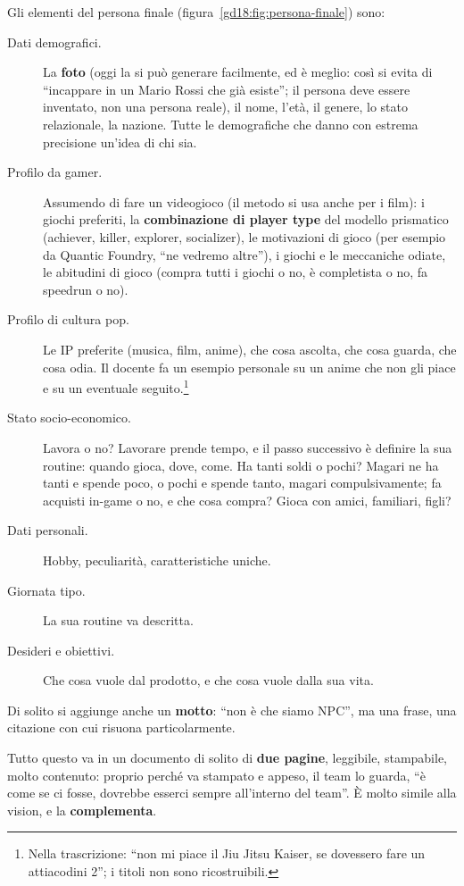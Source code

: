 Gli elementi del persona finale (figura~\ref{gd18:fig:persona-finale}) sono:
\begin{description}
  \item[Dati demografici.] La \textbf{foto} (oggi la si può generare facilmente, ed è
        meglio: così si evita di ``incappare in un Mario Rossi che già esiste''; il
        persona deve essere inventato, non una persona reale), il nome, l'età, il
        genere, lo stato relazionale, la nazione. Tutte le demografiche che danno con
        estrema precisione un'idea di chi sia.
  \item[Profilo da gamer.] Assumendo di fare un videogioco (il metodo si usa anche per
        i film): i giochi preferiti, la \textbf{combinazione di player type} del
        modello prismatico (achiever, killer, explorer, socializer), le motivazioni di
        gioco (per esempio da Quantic Foundry, ``ne vedremo altre''), i giochi e le
        meccaniche odiate, le abitudini di gioco (compra tutti i giochi o no, è
        completista o no, fa speedrun o no).
  \item[Profilo di cultura pop.] Le IP preferite (musica, film, anime), che cosa
        ascolta, che cosa guarda, che cosa odia. Il docente fa un esempio personale
        su un anime che non gli piace e su un eventuale seguito.\footnote{Nella
        trascrizione: ``non mi piace il Jiu Jitsu Kaiser, se dovessero fare un
        attiacodini 2''; i titoli non sono ricostruibili.}
  \item[Stato socio-economico.] Lavora o no? Lavorare prende tempo, e il passo
        successivo è definire la sua routine: quando gioca, dove, come. Ha tanti soldi
        o pochi? Magari ne ha tanti e spende poco, o pochi e spende tanto, magari
        compulsivamente; fa acquisti in-game o no, e che cosa compra? Gioca con amici,
        familiari, figli?
  \item[Dati personali.] Hobby, peculiarità, caratteristiche uniche.
  \item[Giornata tipo.] La sua routine va descritta.
  \item[Desideri e obiettivi.] Che cosa vuole dal prodotto, e che cosa vuole dalla
        sua vita.
\end{description}
Di solito si aggiunge anche un \textbf{motto}: ``non è che siamo NPC'', ma una frase,
una citazione con cui risuona particolarmente.

Tutto questo va in un documento di solito di \textbf{due pagine}, leggibile,
stampabile, molto contenuto: proprio perché va stampato e appeso, il team lo guarda,
``è come se ci fosse, dovrebbe esserci sempre all'interno del team''. È molto simile
alla vision, e la \textbf{complementa}.

